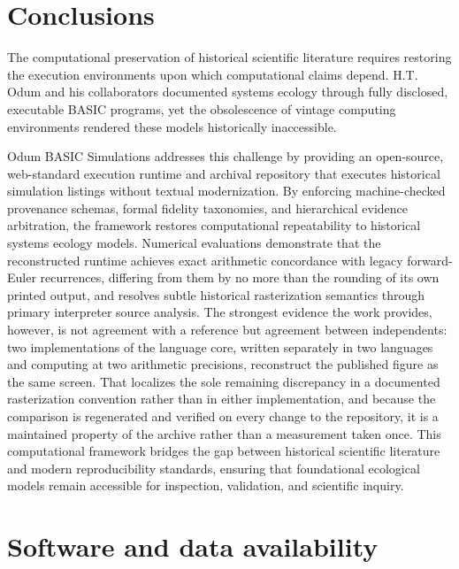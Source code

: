 \documentclass[3p,times,authoryear,twocolumn]{elsarticle}
\begin{document}
\section{Conclusions}
\label{sec:conclusions}

The computational preservation of historical scientific literature requires restoring the execution environments upon which computational claims depend. H.T. Odum and his collaborators documented systems ecology through fully disclosed, executable BASIC programs, yet the obsolescence of vintage computing environments rendered these models historically inaccessible.

Odum BASIC Simulations addresses this challenge by providing an open-source, web-standard execution runtime and archival repository that executes historical simulation listings without textual modernization. By enforcing machine-checked provenance schemas, formal fidelity taxonomies, and hierarchical evidence arbitration, the framework restores computational repeatability to historical systems ecology models. Numerical evaluations demonstrate that the reconstructed runtime achieves exact arithmetic concordance with legacy forward-Euler recurrences, differing from them by no more than the rounding of its own printed output, and resolves subtle historical rasterization semantics through primary interpreter source analysis. The strongest evidence the work provides, however, is not agreement with a reference but agreement between independents: two implementations of the language core, written separately in two languages and computing at two arithmetic precisions, reconstruct the published figure as the same screen. That localizes the sole remaining discrepancy in a documented rasterization convention rather than in either implementation, and because the comparison is regenerated and verified on every change to the repository, it is a maintained property of the archive rather than a measurement taken once. This computational framework bridges the gap between historical scientific literature and modern reproducibility standards, ensuring that foundational ecological models remain accessible for inspection, validation, and scientific inquiry.

\section*{Software and data availability}
\end{document}
